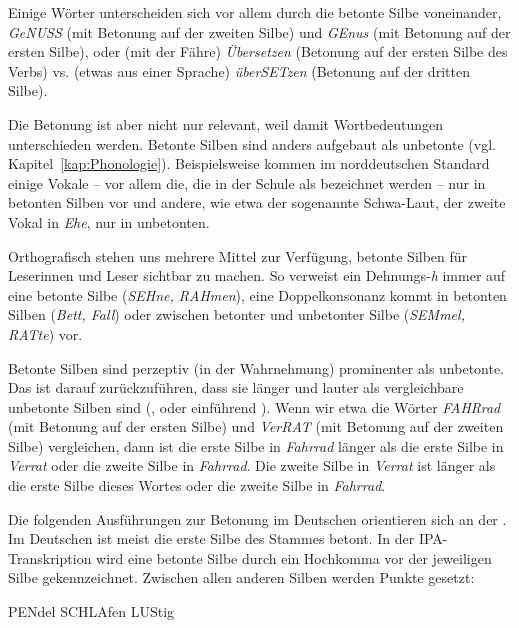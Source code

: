 Einige Wörter unterscheiden sich vor allem durch die betonte Silbe voneinander, \zB \textit{GeNUSS} (mit Betonung auf der zweiten Silbe) und \textit{GEnus} (mit Betonung auf der ersten Silbe), oder (mit der Fähre) \textit{Übersetzen} (Betonung auf der ersten Silbe des Verbs) vs. (etwas aus einer Sprache) \textit{überSETzen} (Betonung auf der dritten Silbe). 

Die Betonung ist aber nicht nur relevant, weil damit Wortbedeutungen unterschieden werden. Betonte Silben sind anders aufgebaut als unbetonte (vgl. Kapitel~\ref{kap:Phonologie}). Beispielsweise kommen im norddeutschen Standard einige Vokale -- vor allem die, die in der Schule als  bezeichnet werden -- nur in betonten Silben vor und andere, wie etwa der sogenannte Schwa-Laut, der zweite Vokal in \textit{Ehe}, nur in unbetonten. 

Orthografisch stehen uns mehrere Mittel zur Verfügung, betonte Silben für Leserinnen und Leser sichtbar zu machen. So verweist ein Dehnungs-\textit{h} immer auf eine betonte Silbe (\textit{SEHne, RAHmen}), eine Doppelkonsonanz kommt in betonten Silben (\textit{Bett, Fall}) oder zwischen betonter und unbetonter Silbe (\textit{SEMmel, RATte}) vor. 

Betonte Silben sind perzeptiv (in der Wahrnehmung) prominenter als unbetonte. Das ist darauf zurückzuführen, dass sie länger und lauter als vergleichbare unbetonte Silben sind (\cite{deJong95}, oder einführend \cite[Kap. 6]{Lodge2009}). Wenn wir etwa die Wörter \textit{FAHRrad} (mit Betonung auf der ersten Silbe) und \textit{VerRAT} (mit Betonung auf der zweiten Silbe) vergleichen, dann ist die erste Silbe in \textit{Fahrrad} länger als die erste Silbe in \textit{Verrat} oder die zweite Silbe in \textit{Fahrrad}. Die zweite Silbe in \textit{Verrat} ist länger als die erste Silbe dieses Wortes oder die zweite Silbe in \textit{Fahrrad}.

Die folgenden Ausführungen zur Betonung im Deutschen orientieren sich an der \citet[619, 631, 635, 902]{Duden2022}. Im Deutschen ist meist die erste Silbe des Stammes betont. In der IPA-Transkrip\-tion wird eine betonte Silbe durch ein Hochkomma vor der jeweiligen Silbe gekennzeichnet. Zwischen allen anderen Silben werden Punkte gesetzt:

\ea
\ea \label{ex:Pendel} PENdel 
\ex \label{ex:schlafen} SCHLAfen 
\ex \label{ex:lustig} LUStig 
\z 
\z

